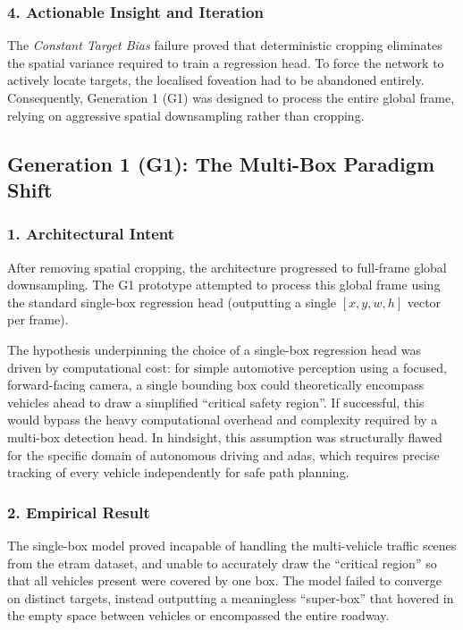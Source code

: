 \subsubsection*{4. Actionable Insight and Iteration}
The \textit{Constant Target Bias} failure proved that deterministic cropping eliminates the spatial variance required to train a regression head.
To force the network to actively locate targets, the localised foveation had to be abandoned entirely.
Consequently, Generation 1 (G1) was designed to process the
entire global frame, relying on aggressive spatial downsampling rather
than cropping.


\subsection{Generation 1 (G1): The Multi-Box Paradigm Shift}

\subsubsection*{1. Architectural Intent}
After removing spatial cropping, the architecture progressed to full-frame global downsampling.
The G1 prototype attempted to process this global frame using the standard single-box
regression head (outputting a single $[x, y, w, h]$ vector per frame).

The hypothesis underpinning the choice of a single-box regression head was driven by computational cost:
for simple automotive perception using a focused, forward-facing camera,
a single bounding box could theoretically encompass vehicles ahead to draw a simplified ``critical safety region''.
If successful, this would bypass the heavy computational overhead and complexity required by a multi-box detection head.
%
In hindsight, this assumption was structurally flawed for the specific domain of autonomous driving and \gls{adas},
which requires precise tracking of every vehicle independently for safe path planning.

\subsubsection*{2. Empirical Result}
The single-box model proved incapable of handling the multi-vehicle traffic scenes from the \gls{etram} dataset,
and unable to accurately draw the ``critical region'' so that all vehicles present were covered by one box.
The model failed to converge on distinct targets, instead outputting a meaningless ``super-box'' that
hovered in the empty space between vehicles or encompassed the entire roadway.

